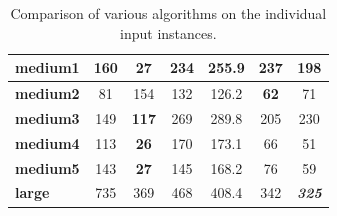 \begin{table}[ht!]
\begin{center}
\begin{tabular}{|l|c|c|c|c|c|c|}
\textbf{medium1} & 160                                 & \textbf{27}                            & 234                                    & 255.9                                  & 237                                    & 198                                    \\ \hline
\textbf{medium2} & 81                                  & 154                                    & 132                                    & 126.2                                  & \textbf{62}                            & 71                                     \\ \hline
\textbf{medium3} & 149                                 & \textbf{117}                           & 269                                    & 289.8                                  & 205                                    & 230                                    \\ \hline
\textbf{medium4} & 113                                 & \textbf{26}                            & 170                                    & 173.1                                  & 66                                     & 51                                     \\ \hline
\textbf{medium5} & 143                                 & \textbf{27}                            & 145                                    & 168.2                                  & 76                                     & 59                                     \\ \hline
\textbf{large}   & 735                                 & 369                                    & 468                                    & 408.4                                  & 342                                    & \textit{\textbf{325}}                  \\ \hline
\end{tabular}
\caption{Comparison of various algorithms on the individual input instances.}
\label{tab:compare}
\end{center}
\end{table}

